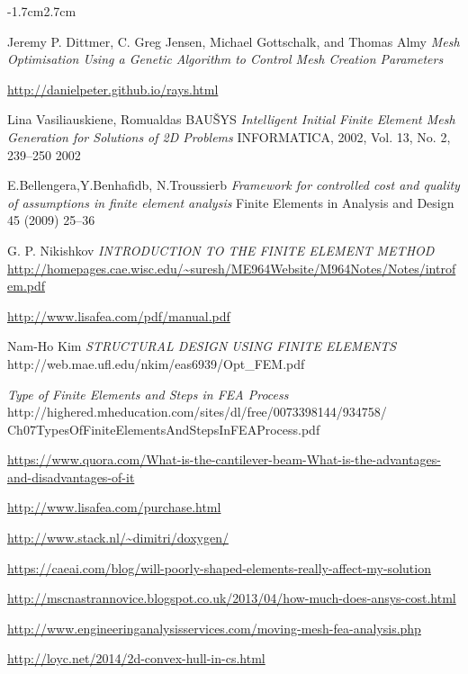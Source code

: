 \documentclass{article}
\newcommand{\CMwidth}{-1.7cm}
\newcommand{\CMheight}{2.7cm}
\begin{document}
\begin{changemargin}{\CMwidth}{\CMheight}
\begin{thebibliography}{9}
 Jeremy P. Dittmer, C. Greg Jensen, Michael Gottschalk, and Thomas Almy \emph{Mesh Optimisation Using a Genetic Algorithm to Control Mesh Creation Parameters}

 \url{http://danielpeter.github.io/rays.html}

 Lina Vasiliauskiene, Romualdas BAUŠYS \emph{Intelligent Initial Finite Element Mesh Generation for Solutions of 2D Problems} INFORMATICA, 2002, Vol. 13, No. 2, 239–250 2002

 E.Bellengera,Y.Benhafidb, N.Troussierb \emph{Framework for controlled cost and quality of assumptions in finite element analysis} Finite Elements in Analysis and Design 45 (2009) 25--36

 G. P. Nikishkov \emph{INTRODUCTION TO THE FINITE ELEMENT METHOD} \url{http://homepages.cae.wisc.edu/~suresh/ME964Website/M964Notes/Notes/introfem.pdf}

 \url{http://www.lisafea.com/pdf/manual.pdf}

Nam-Ho Kim \emph{STRUCTURAL DESIGN USING FINITE ELEMENTS} http://web.mae.ufl.edu/nkim/eas6939/Opt\_FEM.pdf

\emph{Type of Finite Elements and Steps in FEA Process}\\
http://highered.mheducation.com/sites/dl/free/0073398144/934758/\\Ch07TypesOfFiniteElementsAndStepsInFEAProcess.pdf 

 \url{https://www.quora.com/What-is-the-cantilever-beam-What-is-the-advantages-and-disadvantages-of-it}

 \url{http://www.lisafea.com/purchase.html}

 \url{http://www.stack.nl/~dimitri/doxygen/} 

 \url{https://caeai.com/blog/will-poorly-shaped-elements-really-affect-my-solution}

 \url{http://mscnastrannovice.blogspot.co.uk/2013/04/how-much-does-ansys-cost.html}

 \url{http://www.engineeringanalysisservices.com/moving-mesh-fea-analysis.php}

 \url{http://loyc.net/2014/2d-convex-hull-in-cs.html}

\end{thebibliography}

\end{changemargin}
\end{document}
